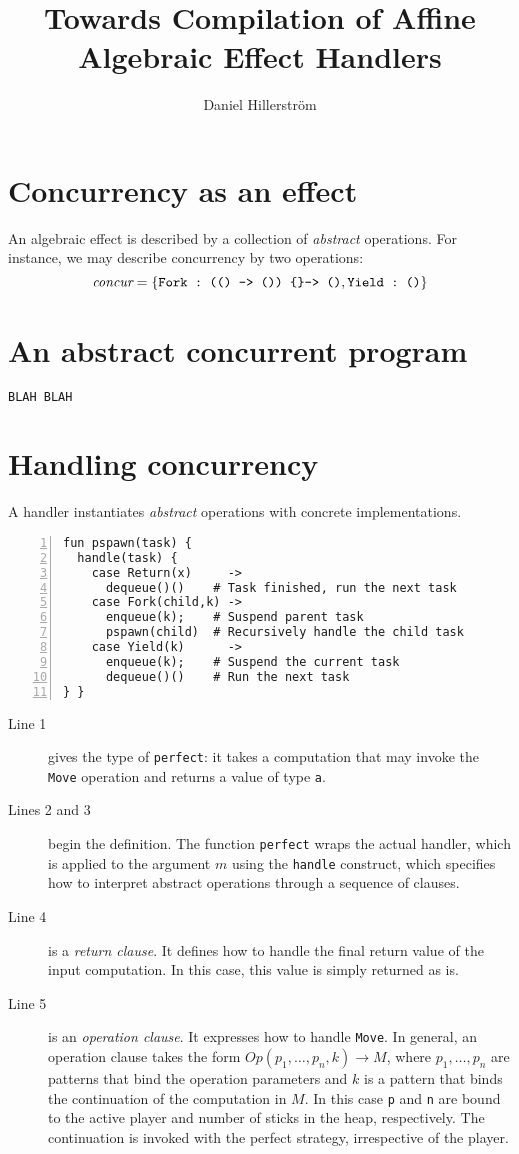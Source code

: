 \documentclass[noback,landscape]{infposter}
\title{Towards Compilation of Affine Algebraic Effect Handlers}
\author{Daniel Hillerström}
\begin{document}
\makeposter

\section{Concurrency as an effect}
An algebraic effect is described by a collection of \emph{abstract} operations. For instance, we may describe concurrency by two operations:
\[
  \emph{concur} = \{\texttt{\lstinline$Fork : (() -> ()) \{\}-> ()$}, \texttt{\lstinline$Yield : ()$}\}
\]

\section{An abstract concurrent program}
\begin{lstlisting}
BLAH BLAH
\end{lstlisting}

\section{Handling concurrency}
A handler instantiates \emph{abstract} operations with concrete implementations.
\begin{lstlisting}[numbers=left]
fun pspawn(task) {
  handle(task) {
    case Return(x)     -> 
      dequeue()()    # Task finished, run the next task
    case Fork(child,k) -> 
      enqueue(k);    # Suspend parent task
      pspawn(child)  # Recursively handle the child task
    case Yield(k)      -> 
      enqueue(k);    # Suspend the current task
      dequeue()()    # Run the next task
} }
\end{lstlisting}
\begin{description}
\item[Line 1] gives the type of \lstinline$perfect$: it takes a
  computation that may invoke the \lstinline$Move$ operation and
  returns a value of type \lstinline$a$.

\item[Lines 2 and 3] begin the definition. The function
  \lstinline$perfect$ wraps the actual handler, which is applied to
  the argument $m$ using the \lstinline$handle$ construct, which
  specifies how to interpret abstract operations through a sequence of
  clauses.

\item[Line 4] is a \emph{return clause}. It defines how to handle the
  final return value of the input computation. In this case, this
  value is simply returned as is.

\item[Line 5] is an \emph{operation clause}. It expresses how to
  handle \lstinline$Move$. In general, an operation clause takes the
  form $Op(p_1,\dots,p_n,k) \to M$, where $p_1,\dots,p_n$ are patterns
  that bind the operation parameters and $k$ is a pattern that binds
  the continuation of the computation in $M$. In this case
  \lstinline$p$ and \lstinline$n$ are bound to the active player and
  number of sticks in the heap, respectively. The continuation is
  invoked with the perfect strategy, irrespective of the player.
\end{description}
\vfill
\end{document}
